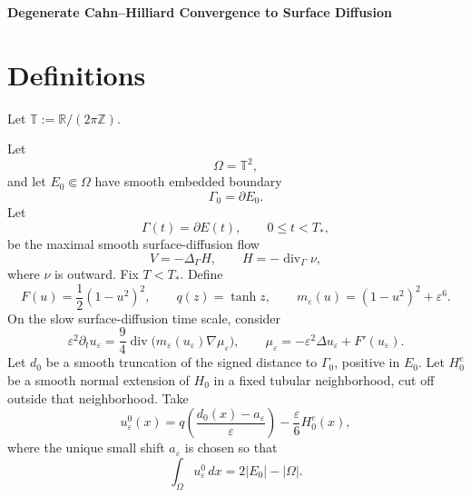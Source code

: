 \documentclass[10pt,a4paper]{article}
\theoremstyle{definition}
\begin{document}
\begin{center}
  {\Large\bfseries Degenerate Cahn--Hilliard Convergence to Surface Diffusion}
\end{center}

\section{Definitions}

Let $\mathbb T:=\mathbb R/(2\pi\mathbb Z)$.

Let
\begin{equation}
  \Omega=\mathbb T^2,
\end{equation}
and let $E_0\Subset\Omega$ have smooth embedded boundary
\begin{equation}
  \Gamma_0=\partial E_0.
\end{equation}
Let
\begin{equation}
  \Gamma(t)=\partial E(t),
  \qquad
  0\leq t<T_*,
\end{equation}
be the maximal smooth surface-diffusion flow
\begin{equation}
  V=-\Delta_\Gamma H,
  \qquad
  H=-\operatorname{div}_\Gamma\nu,
\end{equation}
where $\nu$ is outward. Fix $T<T_*$. Define
\begin{equation}
  F(u)=\frac{1}{2}(1-u^2)^2,
  \qquad
  q(z)=\tanh z,
  \qquad
  m_\varepsilon(u)=(1-u^2)^2+\varepsilon^6.
\end{equation}
On the slow surface-diffusion time scale, consider
\begin{equation}\label{eq:ch}
  \varepsilon^2\partial_tu_\varepsilon
  =
  \frac{9}{4}
  \operatorname{div}
  \bigl(m_\varepsilon(u_\varepsilon)\nabla\mu_\varepsilon\bigr),
  \qquad
  \mu_\varepsilon
  =
  -\varepsilon^2\Delta u_\varepsilon+F'(u_\varepsilon).
\end{equation}
Let $d_0$ be a smooth truncation of the signed distance to $\Gamma_0$,
positive in $E_0$. Let $H_0^e$ be a smooth normal extension of $H_0$ in a
fixed tubular neighborhood, cut off outside that neighborhood. Take
\begin{equation}
  u_\varepsilon^0(x)
  =
  q\left(\frac{d_0(x)-a_\varepsilon}{\varepsilon}\right)
  -\frac{\varepsilon}{6}H_0^e(x),
\end{equation}
where the unique small shift $a_\varepsilon$ is chosen so that
\begin{equation}
  \int_\Omega u_\varepsilon^0\,dx
  =
  2|E_0|-|\Omega|.
\end{equation}
\end{document}
